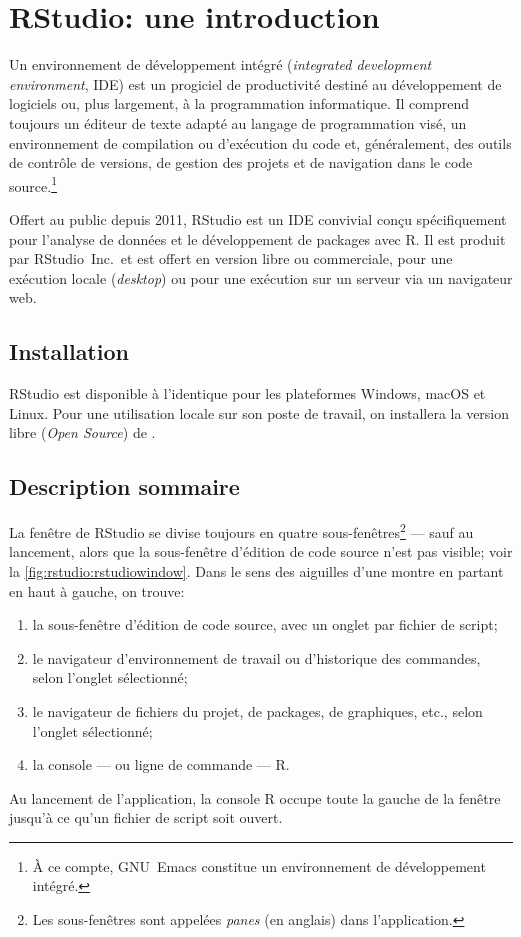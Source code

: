 \chapter{RStudio: une introduction}
\label{chap:rstudio}

Un environnement de développement intégré (\emph{integrated
  development environment}, IDE) est un progiciel de productivité
destiné au développement de logiciels ou, plus largement, à la
programmation informatique. Il comprend toujours un éditeur de texte
adapté au langage de programmation visé, un environnement de
compilation ou d'exécution du code et, généralement, des outils de
contrôle de versions, de gestion des projets et de navigation dans le
code source.\footnote{%
  À ce compte, GNU~Emacs constitue un environnement de développement
  intégré.} %

Offert au public depuis 2011, RStudio est un IDE convivial conçu
spécifiquement pour l'analyse de données et le développement de
packages avec R. Il est produit par RStudio~Inc.\ et est offert en
version libre ou commerciale, pour une exécution locale
(\emph{desktop}) ou pour une exécution sur un serveur via un
navigateur web.


\section{Installation}
\label{sec:rstudio:installation}

RStudio est disponible à l'identique pour les plateformes Windows,
macOS et Linux. Pour une utilisation locale sur son poste de travail,
on installera la version libre (\emph{Open Source}) de
.


\section{Description sommaire}
\label{sec:rstudio:description}

La fenêtre de RStudio se divise toujours en quatre
sous-fenêtres\footnote{%
  Les sous-fenêtres sont appelées \emph{panes} (en anglais) dans
  l'application.} %
--- sauf au lancement, alors que la sous-fenêtre d'édition de code
source n'est pas visible; voir la \autoref{fig:rstudio:rstudiowindow}.
Dans le sens des aiguilles d'une montre en partant en haut à gauche,
on trouve:
\begin{enumerate}
\item la sous-fenêtre d'édition de code source, avec un onglet par
  fichier de script;
\item le navigateur d'environnement de travail ou d'historique des
  commandes, selon l'onglet sélectionné;
\item le navigateur de fichiers du projet, de packages, de graphiques,
  etc., selon l'onglet sélectionné;
\item la console --- ou ligne de commande --- R.
\end{enumerate}
Au lancement de l'application, la console R occupe toute la gauche de
la fenêtre jusqu'à ce qu'un fichier de script soit ouvert.

